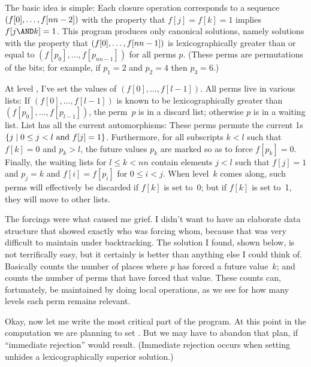 \fi

The basic idea is simple: Each closure operation corresponds to
a sequence $(f[0],\ldots,f[\relax{\\{nn}}-2])$ with the property that
$f[j]=f[k]=1$ implies $f[j\AND k]=1$. This program produces only
canonical solutions, namely solutions with the property that
$(f[0],\ldots,f[\relax{\\{nn}}-1])$ is lexicographically greater than or equal to
$(f[p_0],\ldots,f[p_{nn-1}])$ for all perms $p$. (These perms are
permutations of the bits; for example, if $p_1=2$ and $p_2=4$ then
$p_3=6$.)

At level , I've set the values of $(f[0],\ldots,f[l-1])$.
All perms live in various lists: If $(f[0],\ldots,f[l-1])$ is known to
be lexicographically greater than $(f[p_0],\ldots,f[p_{l-1}])$,
the perm~$p$ is in a discard list; otherwise $p$ is in a waiting list.
List  has all the current automorphisms: These perms
permute the current 1s $\{j\mid 0\le j<l\ {\rm and}\ f[j]=1\}$.
Furthermore, for all subscripts $k<l$ such that $f[k]=0$ and $p_k>l$,
the future values $p_k$ are marked so as to force $f[p_k]=0$.
Finally, the waiting lists  for $l\le k<nn$ contain elements
$j<l$ such that $f[j]=1$ and $p_j=k$ and $f[i]=f[p_i]$ for
$0\le i<j$. When level~$k$ comes along, such perms will effectively
be discarded if $f[k]$ is set to~0; but if $f[k]$ is set to~1,
they will move to other lists.

The forcings were what caused me grief. I didn't want to have an
elaborate data structure that showed exactly who was forcing whom,
because that was very difficult to maintain under backtracking.
The solution I found, shown below, is not terrifically easy, but
it certainly is better than anything else I could think of.
Basically  counts the number of places where $p$ has
forced a future value~$k$; and  counts the number of perms
that have forced that value. These counts can, fortunately, be maintained by
doing local operations, as we see for how many levels
each perm remains relevant.

\fi

Okay, now let me write the most critical part of the program.
At this point in the computation
we are planning to set . But we may have to
abandon that plan, if ``immediate rejection'' would result.
(Immediate rejection occurs when setting  unhides a
lexicographically superior solution.)

